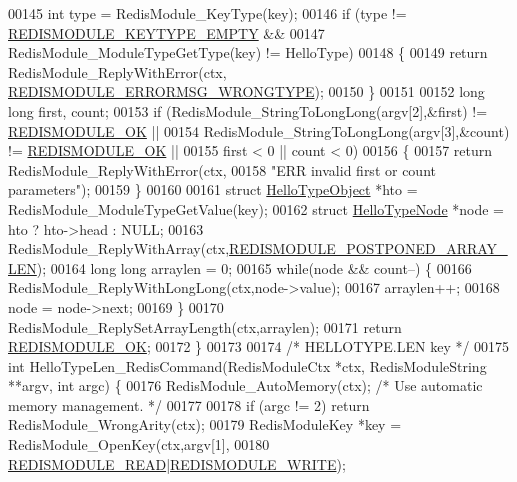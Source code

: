\begin{DoxyCode}
00145     \textcolor{keywordtype}{int} type = RedisModule\_KeyType(key);
00146     \textcolor{keywordflow}{if} (type != \hyperlink{redismodule_8h_adf2819748eb5e89c621d2c9c65c0b5f7}{REDISMODULE\_KEYTYPE\_EMPTY} &&
00147         RedisModule\_ModuleTypeGetType(key) != HelloType)
00148     \{
00149         \textcolor{keywordflow}{return} RedisModule\_ReplyWithError(ctx,
      \hyperlink{redismodule_8h_ab897689b0673a1e4cbc097cb5bce04c1}{REDISMODULE\_ERRORMSG\_WRONGTYPE});
00150     \}
00151 
00152     \textcolor{keywordtype}{long} \textcolor{keywordtype}{long} first, count;
00153     \textcolor{keywordflow}{if} (RedisModule\_StringToLongLong(argv[2],&first) != \hyperlink{redismodule_8h_a1bc5bfd69abcd378ff52c640adc5418d}{REDISMODULE\_OK} ||
00154         RedisModule\_StringToLongLong(argv[3],&count) != \hyperlink{redismodule_8h_a1bc5bfd69abcd378ff52c640adc5418d}{REDISMODULE\_OK} ||
00155         first < 0 || count < 0)
00156     \{
00157         \textcolor{keywordflow}{return} RedisModule\_ReplyWithError(ctx,
00158             \textcolor{stringliteral}{"ERR invalid first or count parameters"});
00159     \}
00160 
00161     \textcolor{keyword}{struct} \hyperlink{structHelloTypeObject}{HelloTypeObject} *hto = RedisModule\_ModuleTypeGetValue(key);
00162     \textcolor{keyword}{struct} \hyperlink{structHelloTypeNode}{HelloTypeNode} *node = hto ? hto->head : NULL;
00163     RedisModule\_ReplyWithArray(ctx,\hyperlink{redismodule_8h_af07005134cbf107aad1c8e0ded8fcf2b}{REDISMODULE\_POSTPONED\_ARRAY\_LEN});
00164     \textcolor{keywordtype}{long} \textcolor{keywordtype}{long} arraylen = 0;
00165     \textcolor{keywordflow}{while}(node && count--) \{
00166         RedisModule\_ReplyWithLongLong(ctx,node->value);
00167         arraylen++;
00168         node = node->next;
00169     \}
00170     RedisModule\_ReplySetArrayLength(ctx,arraylen);
00171     \textcolor{keywordflow}{return} \hyperlink{redismodule_8h_a1bc5bfd69abcd378ff52c640adc5418d}{REDISMODULE\_OK};
00172 \}
00173 
00174 \textcolor{comment}{/* HELLOTYPE.LEN key */}
00175 \textcolor{keywordtype}{int} HelloTypeLen\_RedisCommand(RedisModuleCtx *ctx, RedisModuleString **argv, \textcolor{keywordtype}{int} argc) \{
00176     RedisModule\_AutoMemory(ctx); \textcolor{comment}{/* Use automatic memory management. */}
00177 
00178     \textcolor{keywordflow}{if} (argc != 2) \textcolor{keywordflow}{return} RedisModule\_WrongArity(ctx);
00179     RedisModuleKey *key = RedisModule\_OpenKey(ctx,argv[1],
00180         \hyperlink{redismodule_8h_a369d2ff4bca768b05f826a12dd694825}{REDISMODULE\_READ}|\hyperlink{redismodule_8h_a73b37117ef94cb4a904361afcc51b6b4}{REDISMODULE\_WRITE});

\end{DoxyCode}
